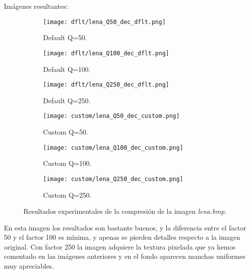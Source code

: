\documentclass[12pt,a4paper]{article}
\begin{document}
Imágenes resultantes:
\begin{figure}   [H]
    \begin{subfigure}{0.30\textwidth}
        \centering
        \texttt{[image: dflt/lena\_Q50\_dec\_dflt.png]}
        \caption{Default Q=50.}
        
    \end{subfigure}
    \hfill
    \begin{subfigure}{0.30\textwidth}
        \centering
        \texttt{[image: dflt/lena\_Q100\_dec\_dflt.png]}
        \caption{Default Q=100.}
        
    \end{subfigure}
    \hfill
    \begin{subfigure}{0.30\textwidth}
        \centering
        \texttt{[image: dflt/lena\_Q250\_dec\_dflt.png]}
        \caption{Default Q=250.}
        
    \end{subfigure}
    
    \vspace{0.5cm}
    
    \begin{subfigure}{0.30\textwidth}
        \centering
        \texttt{[image: custom/lena\_Q50\_dec\_custom.png]}
        \caption{Custom Q=50.}
        
    \end{subfigure}
    \hfill
    \begin{subfigure}{0.30\textwidth}
        \centering
        \texttt{[image: custom/lena\_Q100\_dec\_custom.png]}
        \caption{Custom Q=100.}
        
    \end{subfigure}
    \hfill
    \begin{subfigure}{0.30\textwidth}
        \centering
        \texttt{[image: custom/lena\_Q250\_dec\_custom.png]}
        \caption{Custom Q=250.}
        
    \end{subfigure}
    
    \caption[Resultados experimentales - lena]{Resultados experimentales de la compresión de la imagen \textit{lena.bmp}.}
    
\end{figure}

En esta imagen los resultados son bastante buenos, y la diferencia entre el factor 50 y el factor 100 es mínima, y apenas se pierden detalles respecto a la imagen original. Con factor 250 la imagen adquiere la textura pixelada que ya hemos comentado en las imágenes anteriores y en el fondo aparecen manchas uniformes muy apreciables.\\ 
\end{document}
